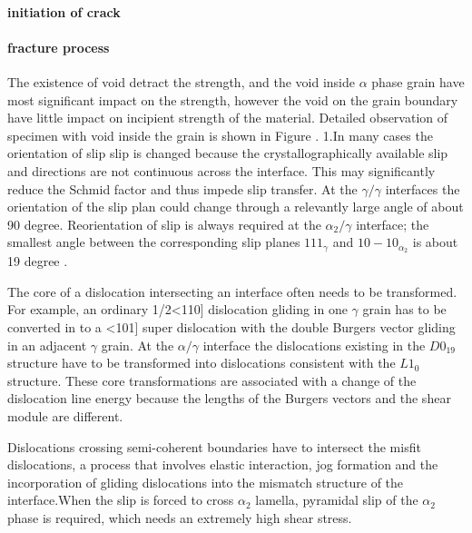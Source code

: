 \documentclass[times]{elsarticle}
\begin{document}
\paragraph{initiation of crack}
\paragraph{fracture process}
The existence of void detract the strength, and the void inside $\alpha$ phase grain have most significant  impact on the strength, however the void on the grain boundary have little impact on incipient strength of the material. Detailed observation of specimen with void inside the grain is shown in Figure \cite{}.
1.In many cases the orientation of slip slip is changed because the crystallographically available slip and directions are not continuous across the interface. This may significantly reduce the Schmid factor and thus impede slip transfer. At the $\gamma/\gamma$ interfaces the orientation of the slip plan could change through a relevantly large angle of about 90 degree. Reorientation of slip is always required at the $\alpha_{2}/\gamma$ interface; the smallest angle between the corresponding slip planes ${1 1 1 }_{\gamma}$ and ${ 1 0 -1 0}_{\alpha_2}$ is about 19 degree \cite{}.

The core of  a dislocation intersecting an interface often needs to be transformed. For example, an ordinary 1/2<110] dislocation gliding in one $\gamma$ grain has to be converted in to a <101] super dislocation with the double Burgers vector gliding in an adjacent $\gamma$ grain. At the $\alpha/\gamma$ interface the dislocations existing in the $D0_{19}$ structure have to be transformed into dislocations consistent with the $L1_0$structure. These core transformations are associated with a change of the dislocation line energy because the lengths of the Burgers vectors and the shear module are different.
 
Dislocations crossing semi-coherent boundaries have to intersect the misfit dislocations, a process that involves elastic interaction, jog formation and the incorporation of gliding dislocations into the mismatch structure of the interface.When the slip is forced to cross $\alpha_2$ lamella, pyramidal slip of the $\alpha_2$ phase is required, which needs an extremely high shear stress.


\end{document}
